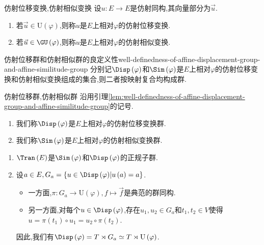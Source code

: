 \begin{definition}{仿射位移变换,仿射相似变换}{}
	设$u:E\to E$是仿射同构,其向量部分为$\vec{u}$.
	\begin{enumerate}
		\item 若$\vec{u}\in\mathrm{U}\left(\varphi\right)$,则称$u$是$E$上相对$\varphi$的仿射位移变换.
		\item 若$\vec{u}\in\GU\left(\varphi\right)$,则称$u$是$E$上相对$\varphi$的仿射相似变换.
	\end{enumerate}
\end{definition}

\begin{lemma}{仿射位移群和仿射相似群的良定义性}{well-definedness-of-affine-displacement-group-and-affine-similitude-group}
	分别记$\Disp\left(\varphi\right)$和$\Sim\left(\varphi\right)$是$E$上相对$\varphi$的仿射位移变换和仿射相似变换组成的集合,则二者按映射复合均构成群.
\end{lemma}

\begin{definition}{仿射位移群,仿射相似群}{}
	沿用引理\ref{lem:well-definedness-of-affine-displacement-group-and-affine-similitude-group}的记号.
	\begin{enumerate}
		\item 我们称$\Disp\left(\varphi\right)$是$E$上相对$\varphi$的仿射位移变换群.
		\item 我们称$\Sim\left(\varphi\right)$是$E$上相对$\varphi$的仿射相似变换群.
	\end{enumerate}
\end{definition}

\begin{remark}{}{}
	\begin{enumerate}
		\item $\Tran\left(E\right)$是$\Sim\left(\varphi\right)$和$\Disp\left(\varphi\right)$的正规子群.
		\item 设$a\in E,G_{a}=\left\{u\in\Disp\left(\varphi\right)\middle|u\left(a\right)=a\right\}$.
		\begin{itemize}
			\item 一方面,$\pi:G_{a}\to\mathrm{U}\left(\varphi\right),f\mapsto\vec{f}$是典范的群同构.
			\item 另一方面,对每个$u\in\Disp\left(\varphi\right)$,存在$u_{1},u_{2}\in G_{a}$和$t_{1},t_{2}\in V$使得$u=\pi\left(t_{1}\right)\circ u_{1}=u_{2}\circ\pi\left(t_{2}\right)$.
		\end{itemize}
		因此,我们有$\Disp\left(\varphi\right)=T\rtimes G_{a}\simeq T\rtimes\mathrm{U}\left(\varphi\right)$.
	\end{enumerate}
\end{remark}


